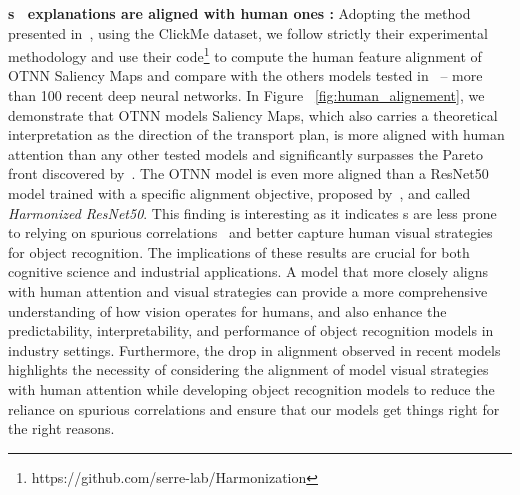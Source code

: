 \textbf{\otnn s~ explanations are aligned with human ones : }
Adopting the method presented in~\cite{linsley2017visual}, using the ClickMe dataset, we follow strictly their experimental methodology and use their code\footnote{https://github.com/serre-lab/Harmonization} to compute the human feature alignment of OTNN Saliency Maps and compare with the others models tested in ~\cite{ fel2022aligning}-- more than 100 recent deep neural networks. In Figure ~\ref{fig:human_alignement}, we demonstrate that 
OTNN models Saliency Maps, %
which also carries a theoretical interpretation as the direction of the transport plan,  is more aligned with human attention than any other tested models and significantly surpasses the Pareto front discovered by~\cite{fel2022aligning}. The OTNN model is even more aligned than a ResNet50 model trained with a specific alignment objective, proposed by~\cite{fel2022aligning}, and called \textit{Harmonized ResNet50}. 
This finding is interesting as it indicates \otnn s are less prone to relying on spurious correlations~\cite{geirhos2020shortcut} and 
better capture
human visual strategies for object recognition.
The implications of these results are crucial for both cognitive science and industrial applications. A model that more closely aligns with human attention and visual strategies can provide a more comprehensive understanding of how vision operates for humans, and also enhance the predictability, interpretability, and performance of object recognition models in industry settings. 
Furthermore, the drop in alignment observed in recent models highlights the necessity of considering the alignment of model visual strategies with human attention while developing object recognition models to reduce the reliance on spurious correlations and ensure that our models get things right for the right reasons.

